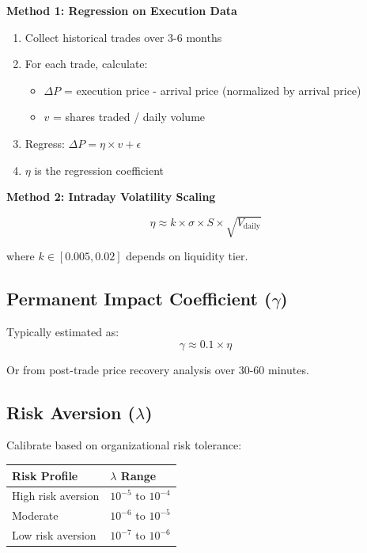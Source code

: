 \documentclass[11pt,a4paper]{article}
\begin{document}
\textbf{Method 1: Regression on Execution Data}

\begin{enumerate}
    \item Collect historical trades over 3-6 months
    \item For each trade, calculate:
    \begin{itemize}
        \item $\Delta P$ = execution price - arrival price (normalized by arrival price)
        \item $v$ = shares traded / daily volume
    \end{itemize}
    \item Regress: $\Delta P = \eta \times v + \epsilon$
    \item $\eta$ is the regression coefficient
\end{enumerate}

\textbf{Method 2: Intraday Volatility Scaling}

\begin{equation}
\eta \approx k \times \sigma \times S \times \sqrt{V_{\text{daily}}}
\end{equation}

where $k \in [0.005, 0.02]$ depends on liquidity tier.

\subsection{Permanent Impact Coefficient ($\gamma$)}

Typically estimated as:
\begin{equation}
\gamma \approx 0.1 \times \eta
\end{equation}

Or from post-trade price recovery analysis over 30-60 minutes.

\subsection{Risk Aversion ($\lambda$)}

Calibrate based on organizational risk tolerance:

\begin{table}[h]
\centering
\begin{tabular}{@{}ll@{}}
\toprule
Risk Profile & $\lambda$ Range \\
\midrule
High risk aversion & $10^{-5}$ to $10^{-4}$ \\
Moderate & $10^{-6}$ to $10^{-5}$ \\
Low risk aversion & $10^{-7}$ to $10^{-6}$ \\
\bottomrule
\end{tabular}
\end{table}
\end{document}
